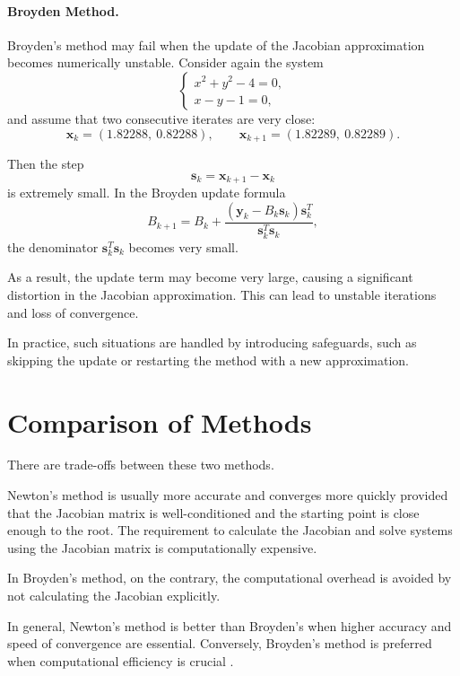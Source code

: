 \paragraph{Broyden Method.}
Broyden's method may fail when the update of the Jacobian approximation becomes numerically unstable. Consider again the system
\begin{equation}
\begin{cases}
x^2 + y^2 - 4 = 0, \\
x - y - 1 = 0,
\end{cases}
\end{equation}
and assume that two consecutive iterates are very close:
\[
\mathbf{x}_k = (1.82288,\ 0.82288), \qquad
\mathbf{x}_{k+1} = (1.82289,\ 0.82289).
\]

Then the step
\[
\mathbf{s}_k = \mathbf{x}_{k+1} - \mathbf{x}_k
\]
is extremely small. In the Broyden update formula
\[
B_{k+1} = B_k + \frac{(\mathbf{y}_k - B_k \mathbf{s}_k)\mathbf{s}_k^T}{\mathbf{s}_k^T \mathbf{s}_k},
\]
the denominator \( \mathbf{s}_k^T \mathbf{s}_k \) becomes very small.

As a result, the update term may become very large, causing a significant distortion in the Jacobian approximation. This can lead to unstable iterations and loss of convergence.

In practice, such situations are handled by introducing safeguards, such as skipping the update or restarting the method with a new approximation.

\section{Comparison of Methods}

There are trade-offs between these two methods.

Newton's method is usually more accurate and converges more quickly provided that the Jacobian matrix is well-conditioned and the starting point is close enough to the root. The requirement to calculate the Jacobian and solve systems using the Jacobian matrix is computationally expensive.

In Broyden's method, on the contrary, the computational overhead is avoided by not calculating the Jacobian explicitly.

In general, Newton's method is better than Broyden's when higher accuracy and speed of convergence are essential. Conversely, Broyden's method is preferred when computational efficiency is crucial \cite{kelley, chapra}.